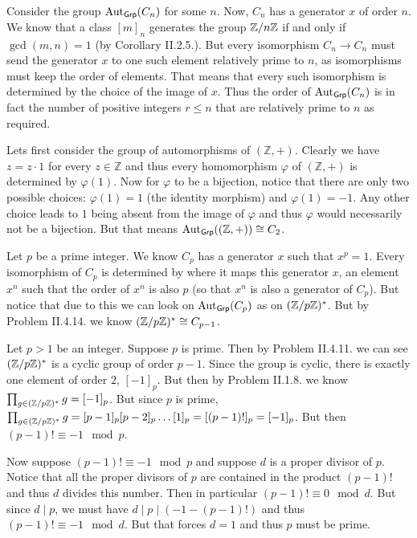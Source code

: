\begin{solution}
	Consider the group $\mathrm{Aut}_{\mathsf{Grp}}(C_n)$ for some $n$. Now, $C_n$ has a generator $x$ of order $n$. We know that a class $[m]_n$ generates the group $\mathbb{Z}/n\mathbb{Z}$ if and only if $\gcd(m, n) = 1$ (by Corollary II.2.5.). But every isomorphism $C_n \to C_n$ must send the generator $x$ to one such element relatively prime to $n$, as isomorphisms must keep the order of elements. That means that every such isomorphism is determined by the choice of the image of $x$. Thus the order of $\mathrm{Aut}_{\mathsf{Grp}}(C_n)$ is in fact the number of positive integers $r \leq n$ that are relatively prime to $n$ as required.
\end{solution}

\begin{problem}
\end{problem}

\begin{solution}
	Lets first consider the group of automorphisms of $(\mathbb{Z}, +)$. Clearly we have $z = z \cdot 1$ for every $z \in \mathbb{Z}$ and thus every homomorphism $\varphi$ of $(\mathbb{Z}, +)$ is determined by $\varphi(1)$. Now for $\varphi$ to be a bijection, notice that there are only two possible choices: $\varphi(1) = 1$ (the identity morphism) and $\varphi(1) = -1$. Any other choice leads to $1$ being absent from the image of $\varphi$ and thus $\varphi$ would necessarily not be a bijection. But that means $\mathrm{Aut}_{\mathsf{Grp}}((\mathbb{Z}, +)) \cong C_2$.
	
	Let $p$ be a prime integer. We know $C_p$ has a generator $x$ such that $x^p = 1$. Every isomorphism of $C_p$ is determined by where it maps this generator $x$, an element $x^n$ such that the order of $x^n$ is also $p$ (so that $x^n$ is also a generator of $C_p$). But notice that due to this we can look on $\mathrm{Aut}_{\mathsf{Grp}}(C_p)$ as on $(\mathbb{Z}/p\mathbb{Z})^*$. But by Problem II.4.14. we know $(\mathbb{Z}/p\mathbb{Z})^* \cong C_{p-1}$.
\end{solution}

\begin{problem}
\end{problem}

\begin{solution}
	Let $p > 1$ be an integer. Suppose $p$ is prime. Then by Problem II.4.11. we can see $(\mathbb{Z}/p\mathbb{Z})^*$ is a cyclic group of order $p-1$. Since the group is cyclic, there is exactly one element of order $2$, $[-1]_p$. But then by Problem II.1.8. we know $\prod_{g \in (\mathbb{Z}/p\mathbb{Z})^*} g = [-1]_p$. But since $p$ is prime, $\prod_{g \in (\mathbb{Z}/p\mathbb{Z})^*} g = [p-1]_p [p-2]_p \dots [1]_p = [(p-1)!]_p = [-1]_p$. But then $(p-1)! \equiv -1 \mod p$.
	
	Now suppose $(p-1)! \equiv -1 \mod p$ and suppose $d$ is a proper divisor of $p$. Notice that all the proper divisors of $p$ are contained in the product $(p-1)!$ and thus $d$ divides this number. Then in particular $(p-1)! \equiv 0 \mod d$. But since $d \mid p$, we must have $d \mid p \mid (-1 - (p-1)!)$ and thus $(p-1)! \equiv -1 \mod d$. But that forces $d = 1$ and thus $p$ must be prime.
\end{solution}

